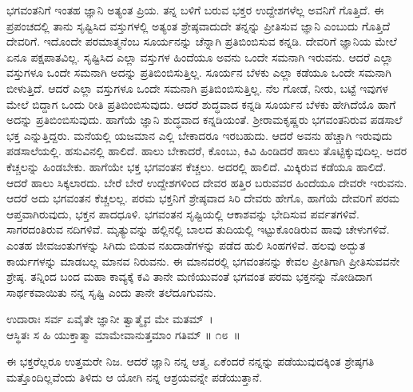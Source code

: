 ಭಗವಂತನಿಗೆ ಇಂತಹ ಜ್ಞಾನಿ ಅತ್ಯಂತ ಪ್ರಿಯ. ತನ್ನ ಬಳಿಗೆ ಬರುವ ಭಕ್ತರ ಉದ್ದೇಶಗಳೆಲ್ಲ ಅವನಿಗೆ ಗೊತ್ತಿದೆ. ಈ ಪ್ರಪಂಚದಲ್ಲಿ ತಾನು ಸೃಷ್ಟಿಸಿದ ವಸ್ತುಗಳಲ್ಲಿ ಅತ್ಯಂತ ಶ್ರೇಷ್ಠವಾದುದೇ ತನ್ನನ್ನು ಪ್ರೀತಿಸುವ ಜ್ಞಾನಿ ಎಂಬುದು ಗೊತ್ತಿದೆ ದೇವರಿಗೆ. ಇದೊಂದೇ ಪರಮಾತ್ಮನೆಂಬ ಸೂರ್ಯನನ್ನು ಚೆನ್ನಾಗಿ ಪ್ರತಿಬಿಂಬಿಸುವ ಕನ್ನಡಿ. ದೇವರಿಗೆ ಜ್ಞಾನಿಯ ಮೇಲೆ ಏನೂ ಪಕ್ಷಪಾತವಿಲ್ಲ. ಸೃಷ್ಟಿಸಿದ ಎಲ್ಲಾ ವಸ್ತುಗಳ ಹಿಂದೆಯೂ ಅವನು ಒಂದೇ ಸಮನಾಗಿ ಇರುವನು. ಆದರೆ ಎಲ್ಲಾ ವಸ್ತುಗಳೂ ಒಂದೇ ಸಮನಾಗಿ ಅದನ್ನು ಪ್ರತಿಬಿಂಬಿಸುತ್ತಿಲ್ಲ. ಸೂರ್ಯನ ಬೆಳಕು ಎಲ್ಲಾ ಕಡೆಯೂ ಒಂದೇ ಸಮನಾಗಿ ಬೀಳುತ್ತಿದೆ. ಆದರೆ ಎಲ್ಲಾ ವಸ್ತುಗಳೂ ಒಂದೇ ಸಮನಾಗಿ ಪ್ರತಿಬಿಂಬಿಸುತ್ತಿಲ್ಲ. ನೆಲ ಗೋಡೆ, ನೀರು, ಬಟ್ಟೆ ಇವುಗಳ ಮೇಲೆ ಬಿದ್ದಾಗ ಒಂದು ರೀತಿ ಪ್ರತಿಬಿಂಬಿಸುವುದು. ಆದರೆ ಶುದ್ಧವಾದ ಕನ್ನಡಿ ಸೂರ್ಯನ ಬೆಳಕು ಹೇಗಿದೆಯೊ ಹಾಗೆ ಅದನ್ನು ಪ್ರತಿಬಿಂಬಿಸುವುದು. ಹಾಗೆಯೆ ಜ್ಞಾನಿ ಶುದ್ಧವಾದ ಕನ್ನಡಿಯಂತೆ. ಶ‍್ರೀರಾಮಕೃಷ್ಣರು ಭಗವಂತನಿರುವ ಪಡಸಾಲೆ ಭಕ್ತ ಎನ್ನುತ್ತಿದ್ದರು. ಮನೆಯಲ್ಲಿ ಯಜಮಾನ ಎಲ್ಲಿ ಬೇಕಾದರೂ ಇರಬಹುದು. ಆದರೆ ಅವನು ಹೆಚ್ಚಾಗಿ ಇರುವುದು ಪಡಸಾಲೆಯಲ್ಲಿ. ಹಸುವಿನಲ್ಲಿ ಹಾಲಿದೆ. ಹಾಲು ಬೇಕಾದರೆ, ಕೊಂಬು, ಕಿವಿ ಹಿಂಡಿದರೆ ಹಾಲು ತೊಟ್ಟಿಕ್ಕುವುದಿಲ್ಲ. ಅದರ ಕೆಚ್ಚಲನ್ನು ಹಿಂಡಬೇಕು. ಹಾಗೆಯೇ ಭಕ್ತ ಭಗವಂತನ ಕೆಚ್ಚಲು. ಅದರಲ್ಲಿ ಹಾಲಿದೆ. ಮಿಕ್ಕಿರುವ ಕಡೆಯೂ ಹಾಲಿದೆ. ಆದರೆ ಹಾಲು ಸಿಕ್ಕಲಾರದು. ಬೇರೆ ಬೇರೆ ಉದ್ದೇಶಗಳಿಂದ ದೇವರ ಹತ್ತಿರ ಬರುವವರ ಹಿಂದೆಯೂ ದೇವರೇ ಇರುವನು. ಆದರೆ ಅದು ಭಗವಂತನ ಕೆಚ್ಚಲಲ್ಲ. ಪರಮ ಭಕ್ತನಿಗೆ ಶ್ರೇಷ್ಠವಾದ ಸಿರಿ ದೇವರು ಹೇಗೊ, ಹಾಗೆಯೆ ದೇವರಿಗೆ ಪರಮ ಆಪ್ತವಾಗಿರುವುದು, ಭಕ್ತನ ಪಾದಧೂಳಿ. ಭಗವಂತನ ಸೃಷ್ಟಿಯಲ್ಲಿ ಆಕಾಶವನ್ನು ಭೇದಿಸುವ ಪರ್ವತಗಳಿವೆ. ಸಾಗರದಂತಿರುವ ನದಿಗಳಿವೆ. ಮೃತ್ಯುವನ್ನು ಹಲ್ಲಿನಲ್ಲಿ ಬಾಲದ ತುದಿಯಲ್ಲಿ ಇಟ್ಟುಕೊಂಡಿರುವ ಹಾವು ಚೇಳುಗಳಿವೆ. ಎಂತಹ ಜೀವಜಂತುಗಳನ್ನು ಸಿಗಿದು ಬಿಡುವ ನಖದಾಡೆಗಳನ್ನು ಪಡೆದ ಹುಲಿ ಸಿಂಹಗಳಿವೆ. ಹಲವು ಅದ್ಭುತ ಕಾರ್ಯಗಳನ್ನು ಮಾಡಬಲ್ಲ ಮಾನವ ನಿರುವನು. ಈ ಮಾನವರಲ್ಲಿ ಭಗವಂತನನ್ನು ಕೇವಲ ಪ್ರೀತಿಗಾಗಿ ಪ್ರೀತಿಸುವವನೇ ಶ್ರೇಷ್ಠ. ತನ್ನಿಂದ ಬಂದ ಮಹಾ ಕಾವ್ಯಕ್ಕೆ ಕವಿ ತಾನೇ ಮಣಿಯುವಂತೆ ಭಗವಂತ ಪರಮ ಭಕ್ತನನ್ನು ನೋಡಿದಾಗ ಸಾರ್ಥಕವಾಯಿತು ನನ್ನ ಸೃಷ್ಟಿ ಎಂದು ತಾನೇ ತಲೆದೂಗುವನು.

\begin{shloka}
ಉದಾರಾಃ ಸರ್ವ ಏವೈತೇ ಜ್ಞಾನೀ ತ್ವಾತ್ಮೈವ ಮೇ ಮತಮ್~।\\ಆಸ್ಥಿತಃ ಸ ಹಿ ಯುಕ್ತಾತ್ಮಾ ಮಾಮೇವಾನುತ್ತಮಾಂ ಗತಿಮ್ \hfill॥ ೧೮~॥
\end{shloka}

\begin{artha}
ಈ ಭಕ್ತರೆಲ್ಲರೂ ಉತ್ತಮರೇ ನಿಜ. ಆದರೆ ಜ್ಞಾನಿ ನನ್ನ ಆತ್ಮ. ಏಕೆಂದರೆ ನನ್ನನ್ನು ಪಡೆಯುವುದಕ್ಕಿಂತ ಶ್ರೇಷ್ಠಗತಿ ಮತ್ತೊಂದಿಲ್ಲವೆಂದು ತಿಳಿದು ಆ ಯೋಗಿ ನನ್ನ ಆಶ್ರಯವನ್ನೇ ಪಡೆಯುತ್ತಾನೆ.
\end{artha}

